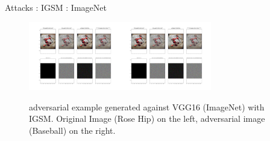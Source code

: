\begin{frame}{Attacks : IGSM : ImageNet}
    \begin{figure}[H]
  \centering
\includegraphics[trim=200 780 1200 212, clip,width=4cm]{2019-04-10-adverse/ILSVRC2012_val_00002900summary_plot.png}\includegraphics[trim=900 780 500 212, clip,width=4cm]{2019-04-10-adverse/ILSVRC2012_val_00002900summary_plot.png}
\caption{adversarial example generated against VGG16 (ImageNet) with IGSM. Original Image (Rose Hip) on the left, adversarial image (Baseball) on the right. }
\label{fgsmhip}
\end{figure}
\end{frame}



